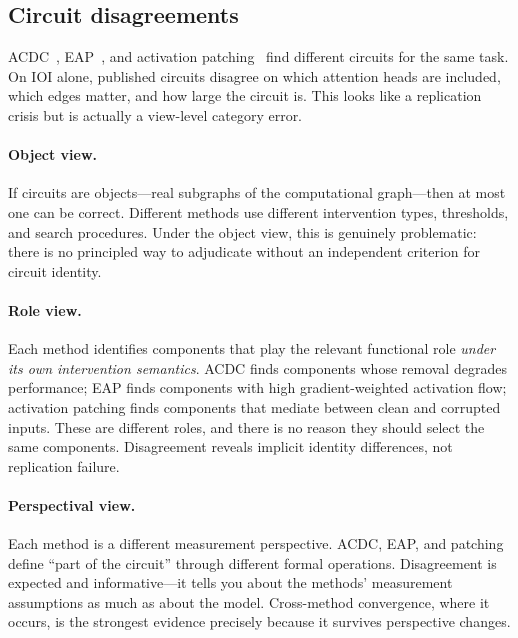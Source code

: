 \documentclass{article}
\begin{document}

\subsection{Circuit disagreements}\label{app:cs_circuit}

ACDC~\citep{conmy2023acdc}, EAP~\citep{syed2023eap}, and activation
patching~\citep{wang2022} find different circuits for the same task. On
IOI alone, published circuits disagree on which attention heads are
included, which edges matter, and how large the circuit is. This looks
like a replication crisis but is actually a view-level category error.

\paragraph{Object view.}
If circuits are objects---real subgraphs of the computational graph---then
at most one can be correct. Different methods use different intervention
types, thresholds, and search procedures. Under the object view, this is
genuinely problematic: there is no principled way to adjudicate without
an independent criterion for circuit identity.

\paragraph{Role view.}
Each method identifies components that play the relevant functional role
\emph{under its own intervention semantics}. ACDC finds components whose
removal degrades performance; EAP finds components with high
gradient-weighted activation flow; activation patching finds components
that mediate between clean and corrupted inputs. These are different
roles, and there is no reason they should select the same components.
Disagreement reveals implicit identity differences, not replication
failure.

\paragraph{Perspectival view.}
Each method is a different measurement perspective. ACDC, EAP, and
patching define ``part of the circuit'' through different formal
operations. Disagreement is expected and informative---it tells you about
the methods' measurement assumptions as much as about the model.
Cross-method convergence, where it occurs, is the strongest evidence
precisely because it survives perspective changes.
\end{document}
